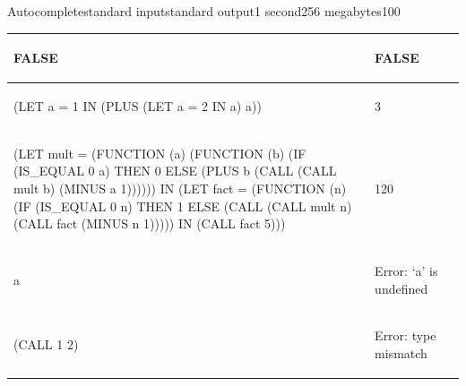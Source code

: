 \documentclass[11pt,a4paper]{article}
\begin{document}
\begin{problem}{Autocomplete}{standard input}{standard output}{1 second}{256 megabytes}{100}
\begin{tabular}{|M{12cm}|M{3.5cm}|N}

    {\begin{codetumso}
FALSE
    \end{codetumso}} & {\begin{codetumso}
FALSE
    \end{codetumso}}
    \\ \hline


    {\begin{codetumso}
(LET a = 1 IN
  (PLUS
    (LET a = 2 IN a)
    a))
    \end{codetumso}} & {\begin{codetumso}
3
    \end{codetumso}}
    \\ \hline


    {\begin{codetumso}
(LET mult = (FUNCTION (a)
              (FUNCTION (b)
                (IF (IS_EQUAL 0 a)
                 THEN 0
                 ELSE (PLUS b (CALL (CALL mult b)
                                    (MINUS a 1)))))) IN
  (LET fact = (FUNCTION (n)
                (IF (IS_EQUAL 0 n)
                 THEN 1
                 ELSE (CALL (CALL mult n)
                            (CALL fact
                                  (MINUS n 1))))) IN
    (CALL fact 5)))
    \end{codetumso}} & {\begin{codetumso}
120
    \end{codetumso}}
    \\ \hline


    {\begin{codetumso}
a
    \end{codetumso}} & {\begin{codetumso}
Error: `a' is undefined
    \end{codetumso}}
    \\ \hline


    {\begin{codetumso}
(CALL 1 2)
    \end{codetumso}} & {\begin{codetumso}
Error: type mismatch
    \end{codetumso}}
    \\ \hline


\end{tabular}
\end{problem}
\end{document}
